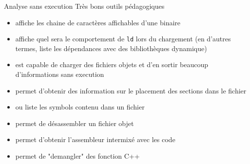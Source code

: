\begin{frame}[fragile=singleslide]{Analyse sans execution}
  Très bons outils pédagogiques
  \begin{itemize}
  \item  {} affiche  les chaine  de  caractères affichables
    d'une binaire
  \item {} affiche quel  sera le comportement de \verb+ld+ lors
    du chargement (en d'autres  termes, liste les dépendances avec des
    bibliothèques dynamique)
  \item {} est  capable de charger des fichiers  objets et d'en
    sortir beaucoup d'informations sans execution
  \item  {} permet  d'obtenir  des  information sur  le
    placement des sections dans le fichier
  \item {} ou  liste les symbols contenu dans un
    fichier
  \item {} permet de désassembler un fichier objet
  \item {}  permet d'obtenir l'assembleur intermixé avec
    les code
  \item {} permet de "demangler" des fonction C++
  \end{itemize}
\end{frame}





